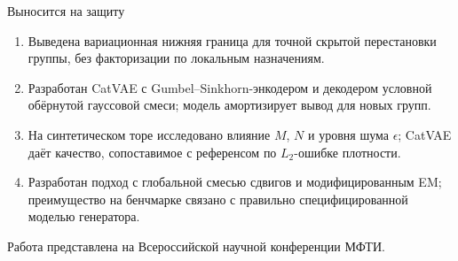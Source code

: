 \documentclass[aspectratio=43, 10pt]{beamer}
\begin{document}
\begin{frame}{Выносится на защиту}
\begin{enumerate}
  \item Выведена вариационная нижняя граница для точной скрытой перестановки группы, без факторизации по локальным назначениям.
  \item Разработан CatVAE с Gumbel--Sinkhorn-энкодером и декодером условной обёрнутой гауссовой смеси; модель амортизирует вывод для новых групп.
  \item На синтетическом торе исследовано влияние $M$, $N$ и уровня шума $\epsilon$; CatVAE даёт качество, сопоставимое с референсом по $L_2$-ошибке плотности.
  \item Разработан подход с глобальной смесью сдвигов и модифицированным EM; преимущество на бенчмарке связано с правильно специфицированной моделью генератора.
\end{enumerate}

Работа представлена на Всероссийской научной конференции МФТИ.

\end{frame}


\end{document}
